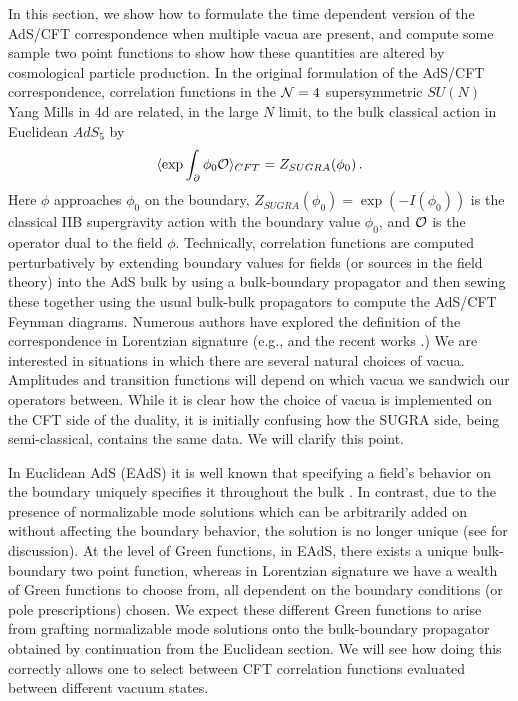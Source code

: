 \documentclass[a4paper,aps,prd,preprintnumbers,groupedaddress]{revtex4}
\begin{document}
In this section, we show how to formulate the time dependent version of the AdS/CFT correspondence  when multiple vacua are present, and compute some sample two
point functions to show how these quantities are altered by cosmological particle production.  In the original formulation of the
AdS/CFT correspondence, correlation functions in the ${\cal N}=4$ supersymmetric $SU(N)$ Yang Mills in 4d are related, in the large $N$ limit, to the bulk classical action in Euclidean $AdS_5$ \cite{maldacena97,witten98,gubser98} by
\begin{equation}
\label{euclidean ads/cft} \langle \exp \int _{\partial} \phi_0 {\cal O} \rangle_{CFT} = Z_{SUGRA} (\phi_0) \, .
\end{equation}
Here $\phi$ approaches $\phi_0$ on the boundary, $Z_{SUGRA} (\phi_0)= \exp(-I(\phi_0)) $ is the classical IIB supergravity action with the
boundary value $\phi_0$, and ${\cal O}$ is the operator dual to the field $\phi$.  Technically, correlation functions
are computed perturbatively by extending boundary values for fields (or sources in the field theory) into the AdS bulk by using a bulk-boundary propagator and then sewing these together using the usual bulk-bulk propagators to compute the AdS/CFT Feynman diagrams.  Numerous authors have explored the definition of the correspondence in Lorentzian signature (e.g., \cite{vijay981,vijay982,banks98,vijay99,giddings99,danielsson,esko} and the recent works
 \cite{son02,herzog02,troost02,kraus02}.)  We are interested in situations in which there are several natural choices of vacua.   Amplitudes and transition functions will depend on  which vacua we sandwich our operators between.   While it is clear how the choice of vacua is implemented on the CFT side of the duality, it is initially confusing how the SUGRA side, being semi-classical, contains the same data.  We will clarify this point.

In Euclidean AdS (EAdS) it is well known that specifying a field's behavior on the boundary uniquely specifies it throughout the bulk
\cite{witten98}. In contrast, due to the presence of normalizable mode solutions which can be arbitrarily added on without affecting the
boundary behavior, the solution is no longer unique (see \cite{vijay981,vijay982} for discussion).     At the level of Green
functions, in EAdS, there exists a unique bulk-boundary two point function, whereas in Lorentzian signature we have a wealth of Green
functions to choose from, all dependent on the boundary conditions (or pole prescriptions) chosen.
We expect these different Green functions to arise from grafting normalizable mode solutions onto the bulk-boundary propagator obtained by continuation from the Euclidean section.  We will see how doing this correctly allows one to select between CFT correlation functions evaluated between different vacuum states.
\end{document}
